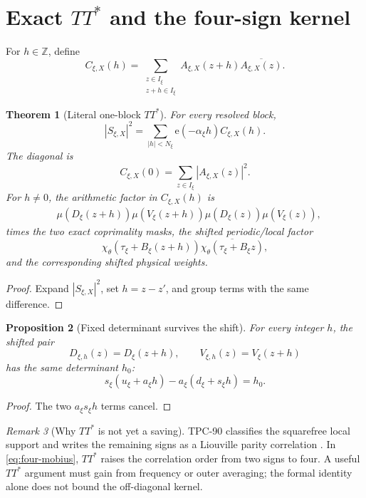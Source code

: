 \documentclass[11pt]{article}
\newtheorem{theorem}{Theorem}[section]
\newtheorem{proposition}[theorem]{Proposition}
\theoremstyle{definition}
\theoremstyle{remark}
\newtheorem{remark}[theorem]{Remark}
\newcommand{\e}{\mathrm e}
\begin{document}
\section{Exact \texorpdfstring{\(TT^*\)}{TT-star} and the
four-sign kernel}

For \(h\in\mathbb Z\), define
\begin{equation}
 C_{\xi,X}(h)
 =
 \sum_{\substack{z\in I_\xi\\z+h\in I_\xi}}
 A_{\xi,X}(z+h)\overline{A_{\xi,X}(z)}.
\label{eq:shift-correlation}
\end{equation}

\begin{theorem}[Literal one-block \(TT^*\)]
\label{thm:block-ttstar}
For every resolved block,
\begin{equation}
 \boxed{
 |S_{\xi,X}|^2
 =
 \sum_{|h|<N_\xi}
 \e(-\alpha_\xi h)C_{\xi,X}(h).}
\label{eq:block-ttstar}
\end{equation}
The diagonal is
\[
 C_{\xi,X}(0)=\sum_{z\in I_\xi}|A_{\xi,X}(z)|^2.
\]
For \(h\ne0\), the arithmetic factor in
\(C_{\xi,X}(h)\) is
\begin{align}
 &\mu(D_\xi(z+h))\mu(V_\xi(z+h))
\mu(D_\xi(z))\mu(V_\xi(z)),
\label{eq:four-mobius}
\end{align}
times the two exact coprimality masks, the shifted periodic/local
factor
\[
 \chi_\theta(\tau_\xi+B_\xi(z+h))
 \overline{\chi_\theta(\tau_\xi+B_\xi z)},
\]
and the corresponding shifted physical weights.
\end{theorem}

\begin{proof}
Expand \(|S_{\xi,X}|^2\), set \(h=z-z'\), and group terms with the
same difference.
\end{proof}

\begin{proposition}[Fixed determinant survives the shift]
\label{prop:shifted-determinant}
For every integer \(h\), the shifted pair
\[
 D_{\xi,h}(z)=D_\xi(z+h),\qquad
 V_{\xi,h}(z)=V_\xi(z+h)
\]
has the same determinant \(h_0\):
\[
 s_\xi(u_\xi+a_\xi h)
 -a_\xi(d_\xi+s_\xi h)=h_0.
\]
\end{proposition}

\begin{proof}
The two \(a_\xi s_\xi h\) terms cancel.
\end{proof}

\begin{remark}[Why \(TT^*\) is not yet a saving]
TPC-90 classifies the squarefree local support and writes the
remaining signs as a Liouville parity correlation
\citep{WangTPC90}.  In \eqref{eq:four-mobius}, \(TT^*\) raises the
correlation order from two signs to four.  A useful \(TT^*\)
argument must gain from frequency or outer averaging; the formal
identity alone does not bound the off-diagonal kernel.
\end{remark}
\end{document}
